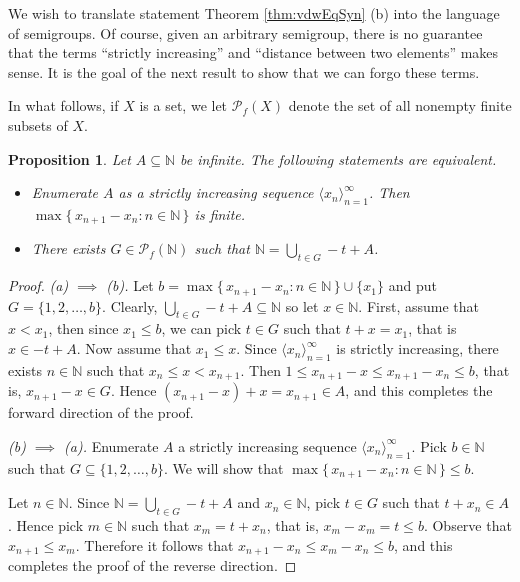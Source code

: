 \documentclass[12pt]{article}
\theoremstyle{plain}
\newtheorem{prop}[thm]{Proposition}
\theoremstyle{definition}
\newcommand{\la}{\langle}
\newcommand{\ra}{\rangle}
\newcommand{\bbN}{\mathbb{N}}
\newcommand{\Pf}{\mathcal{P}_f}
\begin{document}
We wish to translate statement Theorem \ref{thm:vdwEqSyn} (b) into the language of semigroups.
Of course, given an arbitrary semigroup, there is no guarantee that the terms ``strictly increasing'' and ``distance between two elements'' makes sense.
It is the goal of the next result to show that we can forgo these terms.

In what follows, if $X$ is a set, we let $\Pf(X)$ denote the set of all nonempty finite subsets of $X$. 

\begin{prop}
  \label{prop:syn}
  Let $A \subseteq \bbN$ be infinite.
  The following statements are equivalent.
  \begin{itemize}
    \item[(a)] Enumerate $A$ as a strictly increasing sequence $\la x_n \ra_{n=1}^\infty$.
      Then $\max\{\, x_{n+1} - x_n : n \in \bbN \,\}$ is finite.

    \item[(b)] There exists $G \in \Pf(\bbN)$ such that $\bbN = \bigcup_{t \in G} -t + A$. 
  \end{itemize}
\end{prop}
\begin{proof}
  \textsl{(a) $\implies$ (b).}
  Let $b = \max\{\, x_{n+1} - x_n : n \in \bbN \,\} \cup \{x_1\}$ and put $G = \{1, 2, \ldots, b\}$. 
  Clearly, $\bigcup_{t \in G} -t + A \subseteq \bbN$ so let $x \in \bbN$. 
  First, assume that $x < x_1$, then since $x_1 \le b$, we can pick $t \in G$ such that $t + x = x_1$, that is $x \in -t + A$.
  Now assume that $x_1 \le x$.
  Since $\la x_n \ra_{n=1}^\infty$ is strictly increasing, there exists $n \in \bbN$ such that $x_n \le x < x_{n+1}$.  
  Then $1 \le x_{n+1} - x \le x_{n+1} - x_n \le b$, that is, $x_{n+1} - x \in G$.
  Hence $(x_{n+1} - x) + x = x_{n+1} \in A$, and this completes the forward direction of the proof.

  \textsl{(b) $\implies$ (a).}
  Enumerate $A$ a strictly increasing sequence $\la x_n \ra_{n=1}^\infty$. 
  Pick $b \in \bbN$ such that $G \subseteq \{1, 2, \ldots, b\}$.
  We will show that $\max\{\, x_{n+1} - x_n : n \in \bbN \,\} \le b$. 

  Let $n \in \bbN$.
  Since $\bbN = \bigcup_{t \in G} -t+A$ and $x_n \in \bbN$, pick $t \in G$ such that $t + x_n \in A$.
  Hence pick $m \in \bbN$ such that $x_m = t + x_n$, that is, $x_m - x_m = t \le b$. 
  Observe that $x_{n+1} \le x_m$.
  Therefore it follows that $x_{n+1} - x_n \le x_m - x_n \le b$, and this completes the proof of the reverse direction.
\end{proof}
\end{document}

